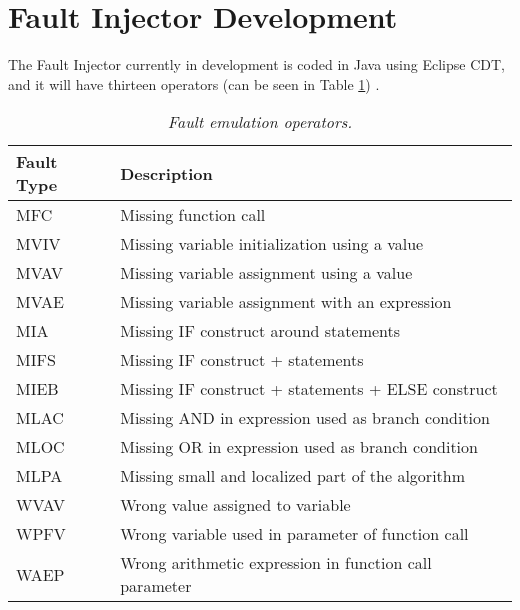 
\newpage
\section{Fault Injector Development}

The Fault Injector currently in development is coded in Java using Eclipse CDT, and it will have thirteen operators (can be seen in Table \ref{tab:faultEmulationOperators})
\cite{duraes2005thesis}.

\begin{table}[!ht]
\begin{tabular}{l|l}
\hline
Fault Type & Description                                            \\ \hline
MFC        & Missing function call                                  \\
MVIV       & Missing variable initialization using a value          \\
MVAV       & Missing variable assignment using a value              \\
MVAE       & Missing variable assignment with an expression         \\
MIA        & Missing IF construct around statements                 \\
MIFS       & Missing IF construct + statements                      \\
MIEB       & Missing IF construct + statements + ELSE construct     \\
MLAC       & Missing AND in expression used as branch condition     \\
MLOC       & Missing OR in expression used as branch condition      \\
MLPA       & Missing small and localized part of the algorithm      \\
WVAV       & Wrong value assigned to variable                       \\
WPFV       & Wrong variable used in parameter of function call      \\
WAEP       & Wrong arithmetic expression in function call parameter \\ \hline
\end{tabular}
\caption{\small \sl Fault emulation operators.\label{tab:faultEmulationOperators}}
\end{table}

